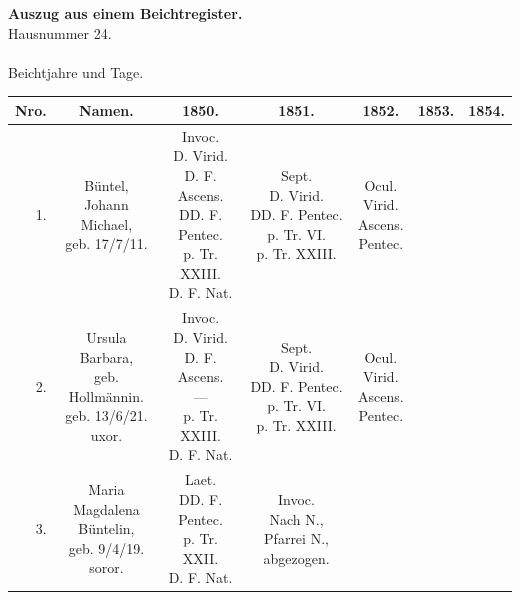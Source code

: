 \clearpage
{}
\begin{sideways}
\begin{minipage}{0.92\textheight}
\begin{center}
{\large\bfseries Auszug aus einem Beichtregister.}\\[0.8em]
Hausnummer 24.\\[0.3em]
{\large {}}\\[0.3em]
Beichtjahre und Tage.\\[0.6em]
\footnotesize
\begin{tabular}{|r|c|c|c|c|c|c|}
\hline
Nro. & Namen. & 1850. & 1851. & 1852. & 1853. & 1854. \\ \hline\hline
1. & \zl{Büntel,\\ Johann Michael,\\ geb. 17/7/11.} & \zl{Invoc.\\ D. Virid.\\ D. F. Ascens.\\ DD. F. Pentec.\\ p. Tr. XXIII.\\ D. F. Nat.} & \zl{Sept.\\ D. Virid.\\ DD. F. Pentec.\\ p. Tr. VI.\\ p. Tr. XXIII.} & \zl{Ocul.\\ Virid.\\ Ascens.\\ Pentec.} & & \\ \hline
2. & \zl{Ursula Barbara,\\ geb. Hollmännin.\\ geb. 13/6/21.\\ uxor.} & \zl{Invoc.\\ D. Virid.\\ D. F. Ascens.\\ —\\ p. Tr. XXIII.\\ D. F. Nat.} & \zl{Sept.\\ D. Virid.\\ DD. F. Pentec.\\ p. Tr. VI.\\ p. Tr. XXIII.} & \zl{Ocul.\\ Virid.\\ Ascens.\\ Pentec.} & & \\ \hline
3. & \zl{Maria Magdalena\\ Büntelin,\\ geb. 9/4/19.\\ soror.} & \zl{Laet.\\ DD. F. Pentec.\\ p. Tr. XXII.\\ D. F. Nat.} & \zl{Invoc.\\[1em] Nach N., Pfarrei N.,\\ abgezogen.} & & & \\ \hline

\end{tabular}
\end{center}
\end{minipage}
\end{sideways}
